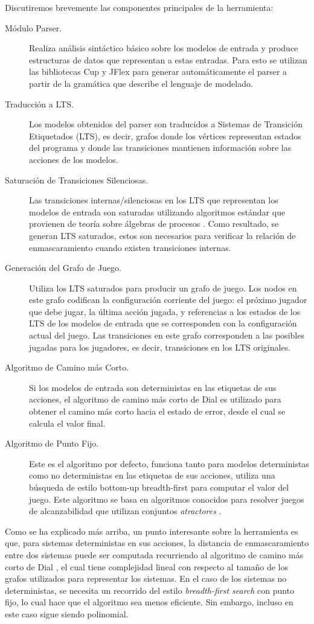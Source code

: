     Discutiremos brevemente las componentes principales de la herramienta:
\begin{description}
    \item[Módulo Parser.] Realiza análisis sintáctico básico sobre los modelos de entrada y produce estructuras de datos que representan a  estas entradas. Para esto se utilizan las bibliotecas \textsf{Cup} y 
    \textsf{JFlex} para generar automáticamente el parser a partir de la gramática que describe el lenguaje de modelado.
    \item[Traducción a LTS.] Los modelos obtenidos del parser son traducidos a Sistemas de Transición Etiquetados (LTS), es decir, 
    grafos donde los vértices representan estados del programa y donde las transiciones mantienen información sobre las acciones de los modelos. 
    \item[Saturación de Transiciones Silenciosas.] Las transiciones internas/silenciosas en los LTS que representan los modelos de entrada son saturadas utilizando algoritmos estándar que provienen de teoría sobre álgebras de procesos \cite{Milner89}. Como resultado, se generan LTS saturados, estos son necesarios para verificar la relación de enmascaramiento cuando existen transiciones internas.
    \item[Generación del Grafo de Juego.] Utiliza los LTS saturados para producir un grafo de juego. Los nodos en este grafo codifican la configuración corriente del juego: 
    el próximo jugador que debe jugar, la última acción jugada, y referencias a los estados de los LTS de los modelos de entrada que se corresponden con la configuración actual del juego. 
    Las transiciones en este grafo corresponden a las posibles jugadas para los jugadores, es decir,  transiciones en los LTS originales.
    \item[Algoritmo de Camino más Corto.] Si los modelos de entrada son deterministas en las etiquetas de sus acciones, el algoritmo de camino más corto de Dial es utilizado para obtener el camino más corto hacia el estado de error, desde el cual se calcula el valor final.
    \item[Algoritmo de Punto Fijo.] Este es el algoritmo por defecto, funciona tanto para modelos deterministas como no deterministas en las etiquetas de sus acciones, utiliza una búsqueda de estilo bottom-up breadth-first para computar el valor del juego. 
    Este algoritmo se basa en algoritmos conocidos para resolver juegos de alcanzabilidad que utilizan conjuntos \emph{atractores} \cite{Jurd11}. 
\end{description}
Como se ha explicado más arriba, un punto interesante sobre la herramienta es que, para sistemas deterministas en sus acciones, la distancia de enmascaramiento entre dos sistemas puede ser computada recurriendo al algoritmo de camino más corto de Dial \cite{Dial69}, el cual tiene complejidad lineal con respecto al tamaño de los grafos utilizados para representar los sistemas.
En el caso de los sistemas no deterministas, se necesita un recorrido del estilo 
\textit{breadth-first search} con punto fijo, lo cual hace que el algoritmo sea menos eficiente. Sin embargo, incluso en este caso sigue siendo polinomial. 

